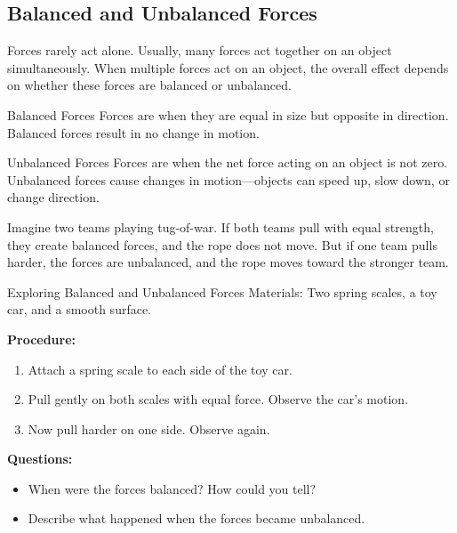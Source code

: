 \subsection{Balanced and Unbalanced Forces}

Forces rarely act alone. Usually, many forces act together on an object simultaneously. When multiple forces act on an object, the overall effect depends on whether these forces are balanced or unbalanced.

\begin{keyconcept}{Balanced Forces}
Forces are  when they are equal in size but opposite in direction. Balanced forces result in no change in motion.
\end{keyconcept}

\begin{keyconcept}{Unbalanced Forces}
Forces are  when the net force acting on an object is not zero. Unbalanced forces cause changes in motion—objects can speed up, slow down, or change direction.
\end{keyconcept}

\begin{example}
Imagine two teams playing tug-of-war. If both teams pull with equal strength, they create balanced forces, and the rope does not move. But if one team pulls harder, the forces are unbalanced, and the rope moves toward the stronger team.
\end{example}

\begin{investigation}{Exploring Balanced and Unbalanced Forces}
Materials: Two spring scales, a toy car, and a smooth surface.

\textbf{Procedure:}
\begin{enumerate}
    \item Attach a spring scale to each side of the toy car.
    \item Pull gently on both scales with equal force. Observe the car's motion.
    \item Now pull harder on one side. Observe again.
\end{enumerate}

\textbf{Questions:}
\begin{itemize}
    \item When were the forces balanced? How could you tell?
    \item Describe what happened when the forces became unbalanced.
\end{itemize}
\end{investigation}

